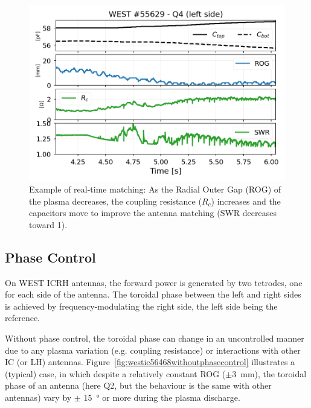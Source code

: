 \documentclass[12p]{iopart}
\begin{document}
\begin{figure}
	\centering
	\includegraphics[width=0.95\linewidth]{figures/WEST_IC_55629_auto_matching}
	\caption{Example of real-time matching: As the Radial Outer Gap (ROG) of the plasma decreases, the coupling resistance ($R_c$) increases and the capacitors move to improve the antenna matching (SWR decreases toward 1).}
	\label{fig:westic55629automatching}
\end{figure}


\subsection{Phase Control}

On WEST ICRH antennas, the forward power is generated by two tetrodes\cite{kuus1989}, one for each side of the antenna. The toroidal phase between the left and right sides is achieved by frequency-modulating the right side, the left side being the reference. 

Without phase control, the toroidal phase can change in an uncontrolled manner due to any plasma variation (e.g. coupling resistance) or interactions with other IC (or LH) antennas. Figure~\ref{fig:westic56468withoutphasecontrol} illustrates a (typical) case, in which despite a relatively constant ROG ($\pm$\SI{3}{\milli\meter}), the toroidal phase of an antenna (here Q2, but the behaviour is the same with other antennas) vary by $\pm$ \SI{15}{\degree} or more during the plasma discharge.
\end{document}

